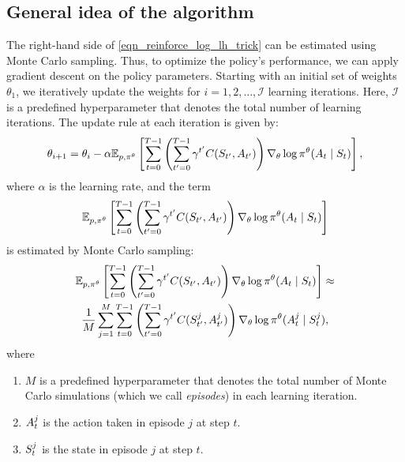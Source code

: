 \documentclass[12pt,twoside]{../../mitthesis}
\begin{document}
\subsection*{General idea of the algorithm}
The right-hand side of \eqref{eqn_reinforce_log_lh_trick} can be estimated using Monte Carlo sampling.
Thus, to optimize the policy's performance, we can apply gradient descent on the policy parameters. 
Starting with an initial set of weights $\theta_1$, we iteratively update the weights for $i = 1, 2, \ldots, \mathcal{I}$ learning iterations. 
Here, $\mathcal{I}$ is a predefined hyperparameter that denotes the total number of learning iterations. 
The update rule at each iteration is given by:
$$
\theta_{i + 1} = \theta_i - \alpha  \E[\transit, \policy^{\theta}]{ \sum_{t = 0}^{T-1}\left(\sum_{t' = 0}^{T-1} \gamma ^ {t'} \Cost(\State_{t'}, \Action_{t'})\right)  \nabla_{\theta}\log \policy^{\theta}(\Action_t \mid \State_t)},
$$
where $\alpha$ is the learning rate, and the term
$$
\E[\transit, \policy^{\theta}]{ \sum_{t = 0}^{T-1}\left(\sum_{t' = 0}^{T-1} \gamma ^ {t'} \Cost(\State_{t'}, \Action_{t'})\right)  \nabla_{\theta}\log \policy^{\theta}(\Action_t \mid \State_t)}
$$
is estimated by Monte Carlo sampling:
\begin{multline*}
\E[\transit, \policy^{\theta}]{ \sum_{t = 0}^{T-1}\left(\sum_{t' = 0}^{T-1} \gamma ^ {t'} \Cost(\State_{t'}, \Action_{t'})\right)  \nabla_{\theta}\log \policy^{\theta}(\Action_t \mid \State_t)}\approx \\
\frac{1}{M}\sum_{j = 1}^M \sum_{t = 0}^{T-1} \left(\sum_{t' = 0}^{T-1} \gamma ^ {t'} \Cost(\State^j_{t'}, \Action^j_{t'})\right)  \nabla_{\theta}\log \policy^{\theta}(\Action^j_t \mid \State^j_t),
\end{multline*}
where 
\begin{enumerate}
    \item $M$ is a predefined hyperparameter that denotes the total number of Monte Carlo simulations (which we call \textit{episodes}) in each learning iteration.
    \item $\Action^j_t$ is the action taken in episode $j$ at step $t$.
    \item $\State^j_t$ is the state in episode $j$ at step $t$.
\end{enumerate}
\end{document}
